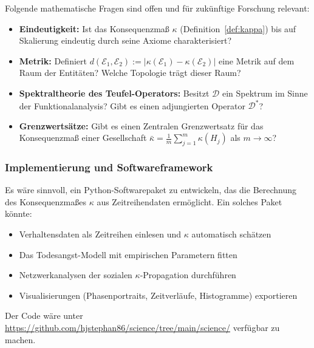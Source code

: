 ﻿\documentclass[a4paper,12pt]{article}
\theoremstyle{definition}
\begin{document}
Folgende mathematische Fragen sind offen und für zukünftige Forschung relevant:
\begin{itemize}
\item \textbf{Eindeutigkeit:} Ist das Konsequenzmaß $\kappa$ (Definition~\ref{def:kappa}) bis auf Skalierung eindeutig durch seine Axiome charakterisiert?
\item \textbf{Metrik:} Definiert $d(\mathcal{E}_1, \mathcal{E}_2) := |\kappa(\mathcal{E}_1) - \kappa(\mathcal{E}_2)|$ eine Metrik auf dem Raum der Entitäten? Welche Topologie trägt dieser Raum?
\item \textbf{Spektraltheorie des Teufel-Operators:} Besitzt $\mathcal{D}$ ein Spektrum im Sinne der Funktionalanalysis? Gibt es einen adjungierten Operator $\mathcal{D}^*$?
\item \textbf{Grenzwertsätze:} Gibt es einen Zentralen Grenzwertsatz für das Konsequenzmaß einer Gesellschaft $\bar{\kappa} = \frac{1}{m} \sum_{j=1}^m \kappa(H_j)$ als $m \to \infty$?
\end{itemize}

\subsubsection{Implementierung und Softwareframework}

Es wäre sinnvoll, ein Python-Softwarepaket zu entwickeln, das die Berechnung des Konsequenzmaßes $\kappa$ aus Zeitreihendaten ermöglicht. Ein solches Paket könnte:
\begin{itemize}
\item Verhaltensdaten als Zeitreihen einlesen und $\kappa$ automatisch schätzen
\item Das Todesangst-Modell mit empirischen Parametern fitten
\item Netzwerkanalysen der sozialen $\kappa$-Propagation durchführen
\item Visualisierungen (Phasenportraits, Zeitverläufe, Histogramme) exportieren
\end{itemize}
Der Code wäre unter \url{https://github.com/hjstephan86/science/tree/main/science/} verfügbar zu machen.
\end{document}

